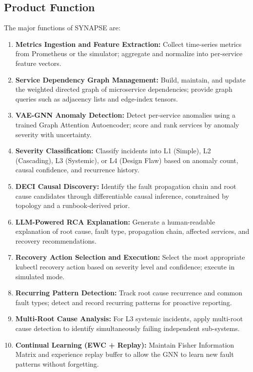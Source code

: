 \documentclass[11pt,a4paper]{article}
\begin{document}

\subsection{Product Function}

The major functions of SYNAPSE are:

\begin{enumerate}
    \item \textbf{Metrics Ingestion and Feature Extraction:} Collect time-series metrics from Prometheus or the simulator; aggregate and normalize into per-service feature vectors.
    \item \textbf{Service Dependency Graph Management:} Build, maintain, and update the weighted directed graph of microservice dependencies; provide graph queries such as adjacency lists and edge-index tensors.
    \item \textbf{VAE-GNN Anomaly Detection:} Detect per-service anomalies using a trained Graph Attention Autoencoder; score and rank services by anomaly severity with uncertainty.
    \item \textbf{Severity Classification:} Classify incidents into L1 (Simple), L2 (Cascading), L3 (Systemic), or L4 (Design Flaw) based on anomaly count, causal confidence, and recurrence history.
    \item \textbf{DECI Causal Discovery:} Identify the fault propagation chain and root cause candidates through differentiable causal inference, constrained by topology and a runbook-derived prior.
    \item \textbf{LLM-Powered RCA Explanation:} Generate a human-readable explanation of root cause, fault type, propagation chain, affected services, and recovery recommendations.
    \item \textbf{Recovery Action Selection and Execution:} Select the most appropriate kubectl recovery action based on severity level and confidence; execute in simulated mode.
    \item \textbf{Recurring Pattern Detection:} Track root cause recurrence and common fault types; detect and record recurring patterns for proactive reporting.
    \item \textbf{Multi-Root Cause Analysis:} For L3 systemic incidents, apply multi-root cause detection to identify simultaneously failing independent sub-systems.
    \item \textbf{Continual Learning (EWC + Replay):} Maintain Fisher Information Matrix and experience replay buffer to allow the GNN to learn new fault patterns without forgetting.

\end{enumerate}
\end{document}

